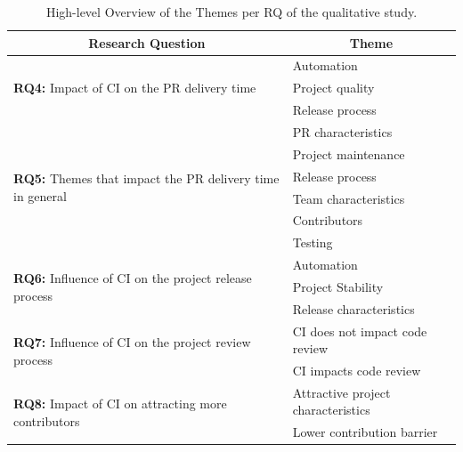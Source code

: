 \begin{table}
	\centering
	\caption{High-level Overview of the Themes per RQ of the qualitative study.}
    \begin{tabular}{cp{15em}}
    \hline
    \textbf{Research Question} & \multicolumn{1}{c}{\textbf{Theme}} \bigstrut\\
    \hline
    \multicolumn{1}{l}{\multirow{3}[6]{*}{\textbf{RQ4:} Impact of CI on the PR delivery time}} & \multicolumn{1}{l}{Automation} \bigstrut\\
    \cline{2-2}          & \multicolumn{1}{l}{Project quality} \bigstrut\\
    \cline{2-2}          & Release process \bigstrut\\
    \hline
    \multicolumn{1}{l}{\multirow{6}[13]{*}{\textbf{RQ5:} Themes that impact the PR delivery time in general}} & \multicolumn{1}{l}{PR characteristics} \bigstrut\\
\cline{2-2}          & \multicolumn{1}{l}{Project maintenance} \bigstrut\\
\cline{2-2}          & \multicolumn{1}{l}{Release process} \bigstrut\\
\cline{2-2}          & \multicolumn{1}{l}{Team characteristics} \bigstrut\\
\cline{2-2}          & \multicolumn{1}{l}{Contributors} \bigstrut\\
\cline{2-2}          & \multicolumn{1}{l}{Testing} \bigstrut\\
    \hline
    \multicolumn{1}{l}{\multirow{3}[6]{*}{\textbf{RQ6:} Influence of CI on the project release process}} & Automation \bigstrut\\
\cline{2-2}          & Project Stability \bigstrut\\
\cline{2-2}          & Release characteristics \bigstrut\\
    \hline
    \multicolumn{1}{l}{\multirow{2}[4]{*}{\textbf{RQ7:} Influence of CI on the project review process}} & CI does not impact code review \bigstrut\\
\cline{2-2}          & CI impacts code review \bigstrut\\
    \hline
    \multicolumn{1}{l}{\multirow{2}[4]{*}{\textbf{RQ8:} Impact of CI on attracting more contributors}} & Attractive project characteristics \bigstrut\\
\cline{2-2}          & Lower contribution barrier \bigstrut\\
    \hline
    \end{tabular}%
  \label{tab:themes_per_research_question}%
\end{table}%
